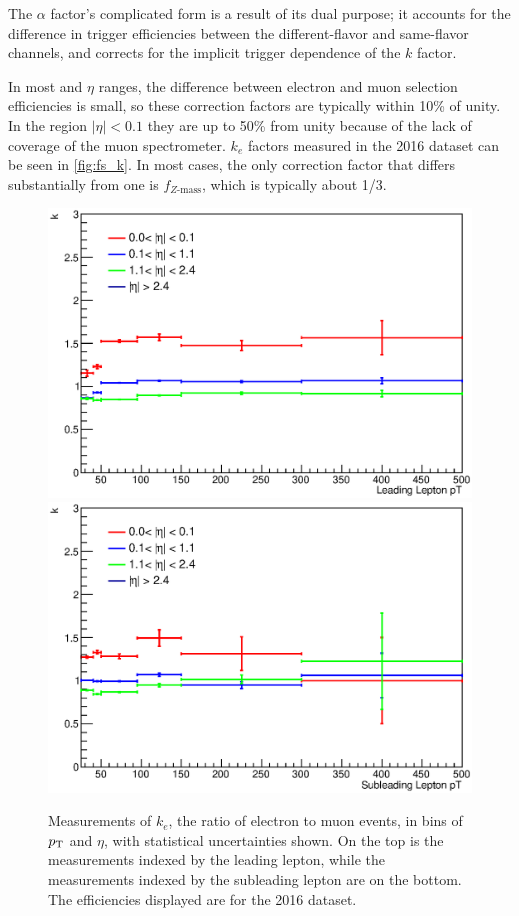 The $\alpha$ factor's complicated form is a result of its dual purpose; it accounts for the difference in trigger efficiencies between the different-flavor and same-flavor channels, and corrects for the implicit trigger dependence of the $k$ factor.  

In most \pT and $\eta$ ranges, the difference between electron and muon selection efficiencies is small, so these correction factors are typically within 10\% of unity. In the region $|\eta|<0.1$ they are up to 50\% from unity because of the lack of coverage of the muon spectrometer. $k_e$ factors measured in the 2016 dataset can be seen in \autoref{fig:fs_k}. In most cases, the only correction factor that differs substantially from one is $f_{Z \mathrm{\text{-}mass}}$, which is typically about 1/3. 

\begin{centering}
\begin{figure}[!hbt]
\myfloatalign
\includegraphics[width=.85\linewidth]{figures/fs/data_efficiencies_2j_Z_lep0.eps}
\includegraphics[width=.85\linewidth]{figures/fs/data_efficiencies_2j_Z_lep1.eps}
\caption{Measurements of $k_e$, the ratio of electron to muon events, in bins of $p_{\text{T}}$ and $\eta$, with statistical uncertainties shown. On the top is the measurements indexed by the leading lepton, while the measurements indexed by the subleading lepton are on the bottom. The efficiencies displayed are for the 2016 dataset.}
\label{fig:fs_k}
\end{figure}
\end{centering}

